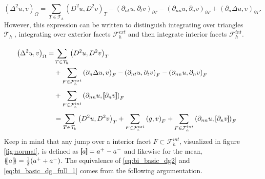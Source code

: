\begin{equation}
\label{eq:bi_basic_dg2}
\left( \Delta  ^{2} u,v \right) _{\Omega } = \sum_{T \in  \mathcal{T} _{h}}^{}  \left( D^2u,D^2v \right) _{T } - \left(\partial _{nt} u, \partial _{t}v
\right)_{\partial T} - \left(\partial _{nn} u, \partial _{n}v \right)_{\partial T} + \left(\partial _{n} \Delta  u,v
\right)_{\partial T}.
\end{equation}
However, this expression can be written to distinguish integrating over triangles $\mathcal{T} _{h}$ , integrating over exterior facets $\mathcal{F} _{h}^{ext}$ and then integrate interior facets $\mathcal{F} _{h}^{int}$.

\begin{equation}
\label{eq:bi_basic_dg_full_1}
\begin{split}
\left( \Delta  ^{2} u, v \right) _{\Omega } =& \sum_{T \in  \mathcal{T} _{h}}^{} \left( D^2u, D^2v \right)_{T}    \\
& + \sum_{F \in \mathcal{F}_{h}^{ext}}  \left(\partial _{n} \Delta u, v  \right) _{F} - \left(\partial _{nt} u, \partial _{t} v \right) _{F}-
\left( \partial _{nn} u, \partial _{n} v \right)_{F}  \\
& + \sum_{F \in \mathcal{F}_{h}  ^{int}}^{} \left(\partial _{nn} u , \jump{ \partial _{n} v }
\right)_{F} \\
& = \sum_{T \in  \mathcal{T} _{h}}^{} \left( D^2u, D^2v \right)_{T} + \sum_{F \in
\mathcal{F} ^{ext}_{h}}^{} \left(g, v  \right) _{F}
  + \sum_{F \in \mathcal{F}_{h}  ^{int}}^{} \left( \partial _{nn} u , \jump{ \partial_{n} v } \right)_{F}
\end{split}
\end{equation}
Keep in mind that any jump over a interior facet $F \subset \mathcal{F} _{h}^{int}   $, visualized in figure \ref{fig:normal}, is defined as $\left[\!\!\left[  a  \right]\!\!\right] =    a^{+} - a^{-} $
and likewise for the mean, $\left\{\!\!\left\{ a  \right\}\!\!\right\} = \frac{1}{2}(   a^{+}
+ a^{-})$.    The equivalence of \eqref{eq:bi_basic_dg2} and \eqref{eq:bi_basic_dg_full_1} comes from the following argumentation.

